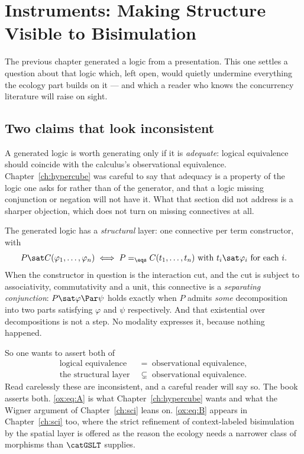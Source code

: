 \chapter{Instruments: Making Structure Visible to Bisimulation}
\label{ch:obsext}

The previous chapter generated a logic from a presentation. This one settles a
question about that logic which, left open, would quietly undermine everything the
ecology part builds on it --- and which a reader who knows the concurrency literature
will raise on sight.

\section{Two claims that look inconsistent}
\label{ox:sec:contradiction}

A generated logic is worth generating only if it is \emph{adequate}: logical
equivalence should coincide with the calculus's observational equivalence.
Chapter~\ref{ch:hypercube} was careful to say that adequacy is a property of the
logic one asks for rather than of the generator, and that a logic missing
conjunction or negation will not have it. What that section did not address is a
sharper objection, which does not turn on missing connectives at all.

The generated logic has a \emph{structural} layer: one connective per term
constructor, with
\[
  P \sat C(\varphi_1,\dots,\varphi_n)
  \iff
  P =_{\eqs} C(t_1,\dots,t_n) \text{ with } t_i \sat \varphi_i
  \text{ for each } i .
\]
When the constructor in question is the interaction cut, and the cut is subject to
associativity, commutativity and a unit, this connective is a \emph{separating
conjunction}: $P \sat \varphi \Par \psi$ holds exactly when $P$ admits
\emph{some} decomposition into two parts satisfying $\varphi$ and $\psi$
respectively. And that existential over decompositions is not a step. No modality
expresses it, because nothing happened.

So one wants to assert both of
\begin{align}
  \text{logical equivalence} \;&=\; \text{observational equivalence},
    \tag{A}\label{ox:eq:A}\\
  \text{the structural layer} \;&\subsetneq\; \text{observational equivalence}.
    \tag{B}\label{ox:eq:B}
\end{align}
Read carelessly these are inconsistent, and a careful reader will say so. The book
asserts both. \eqref{ox:eq:A} is what Chapter~\ref{ch:hypercube} wants and what the
Wigner argument of Chapter~\ref{ch:sci} leans on. \eqref{ox:eq:B} appears in
Chapter~\ref{ch:sci} too, where the strict refinement of context-labeled
bisimulation by the spatial layer is offered as the reason the ecology needs a
narrower class of morphisms than $\catGSLT$ supplies.

